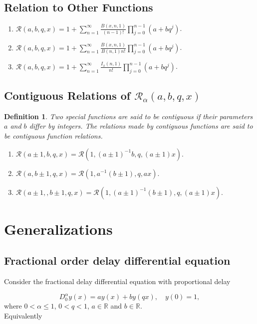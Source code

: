 \documentclass[12pt]{article}
\newtheorem{Def}{Definition}[section]
\numberwithin{equation}{section}
\begin{document}
\subsection{Relation to Other Functions}
\begin{enumerate}
\item$\mathcal{R}(a, b, q, x) =  1 + \sum_{n=1}^\infty \frac{B(x,n,1)}{(n-1)!}\prod_{j=0}^{n-1}\left(a+bq^j\right)$.
\item$\mathcal{R}(a, b, q, x) =  1 + \sum_{n=1}^\infty \frac{B(x,n,1)}{B(n,1)n!}\prod_{j=0}^{n-1}\left(a+bq^j\right)$.
\item$\mathcal{R}(a, b, q, x) =  1 + \sum_{n=1}^\infty \frac{I_x(n,1)}{n!}\prod_{j=0}^{n-1}\left(a+bq^j\right)$.
\end{enumerate}
\subsection{Contiguous Relations of  $\mathcal{R}_\alpha(a,b,q,x)$}
\begin{Def} \cite{Erdelyi}
Two special functions are said to be contiguous if their parameters $a$ and $b$  differ by integers. The relations made by contiguous functions are said to be contiguous function relations.
\end{Def}
\begin{enumerate}
\item$\mathcal{R}(a\pm 1, b, q, x) = \mathcal{R}( 1, (a \pm 1)^{-1} b, q, (a \pm 1)x)$.
\item$\mathcal{R}(a, b\pm 1, q, x) = \mathcal{R}( 1, a^{-1}(b \pm 1), q, ax)$.
\item$\mathcal{R}(a\pm 1,, b\pm 1, q, x) = \mathcal{R}( 1, (a \pm 1)^{-1}(b \pm 1), q,  (a \pm 1)x)$.
\end{enumerate}



\section{Generalizations}\label{gen}

\subsection{Fractional order delay differential equation}
Consider the fractional delay differential equation with proportional delay 

\begin{equation}
D^\alpha_0y(x) = ay(x)+ by(q x),\quad y(0)= 1, \label{7.1.1}
\end{equation}
where  $0<\alpha \leq 1$, $0<q<1$, $a \in \mathbb{R}$ and $b \in \mathbb{R}$.\\
Equivalently
\end{document}
